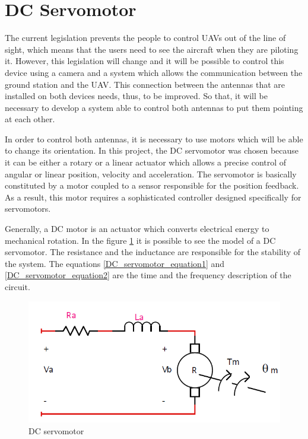 \section{DC Servomotor}\label{sec:servo_motor}

The current legislation prevents the people to control UAVs out of the line of sight, which means that the users need to see the aircraft when they are piloting it. However, this legislation will change and it will be possible to control this device using a camera and a system which allows the communication between the ground station and the UAV. This connection between the antennas that are installed on both devices needs, thus, to be improved. So that, it will be necessary to develop a system able to control both antennas to put them pointing at each other.

In order to control both antennas, it is necessary to use motors which will be able to change its orientation. In this project, the DC servomotor was chosen because it can be either a rotary or a linear actuator which allows a precise control of angular or linear position, velocity and acceleration. The servomotor is basically constituted by a motor coupled to a sensor responsible for the position feedback. As a result, this motor requires a sophisticated controller designed specifically for servomotors.

Generally, a DC motor is an actuator which converts electrical energy to mechanical rotation. In the figure \ref{DC_servomotor_circuit} it is possible to see the model of a DC servomotor. The resistance and the inductance are responsible for the stability of the system. The equations \ref{DC_servomotor_equation1} and \ref{DC_servomotor_equation2} are the time and the frequency description of the circuit.

\begin{figure}[H]
\centering
\includegraphics[scale=0.5]{figures/servomotor.png}
\caption{DC servomotor}
\label{DC_servomotor_circuit}
\end{figure}

